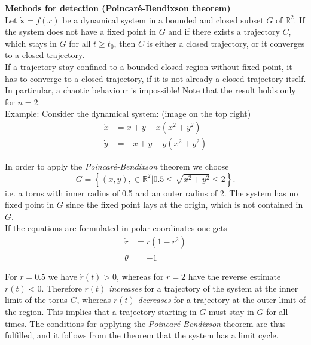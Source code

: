 \textbf{Methods for detection (Poincaré-Bendixson theorem)}\\
Let $\dot{\mathbf{x}} = f(x)$ be a dynamical system in a bounded and closed subset $G$ of $\mathbb{R}^2$. If the system does not have a fixed point in $G$ and if there exists a trajectory $C$, which stays in $G$ for all $t \geq t_0$, then $C$ is either a closed trajectory, or it converges to a closed trajectory.\\
If a trajectory stay confined to a bounded closed region without fixed point, it has to converge to a closed trajectory, if it is not already a closed trajectory itself. In particular, a chaotic behaviour is impossible! Note that the result holds only for $n = 2$.\\

Example: Consider the dynamical system: (image on the top right)
\begin{equation}
  \begin{split}
    \dot{x} &= x + y - x(x^2 + y^2)\\
    \dot{y} &= -x + y -y(x^2 + y^2)
  \end{split}
\end{equation}

In order to apply the \emph{Poincaré-Bendixson} theorem we choose
\begin{equation}
  G = \left \{(x, y), \in \mathbb{R}^2|0.5 \leq \sqrt{x^2 + y^2}\leq 2 \right \}.
\end{equation}
i.e. a torus with inner radius of 0.5 and an outer radius of 2. The system has no fixed point in $G$ since the fixed point lays at the origin, which is not contained in $G$.\\
If the equations are formulated in polar coordinates one gets
\begin{equation}
  \begin{split}
    \dot{r} &= r(1-r^2)\\
    \dot{\theta} &= -1
  \end{split}
\end{equation}

For $r = 0.5$ we have $\dot{r}(t) > 0$, whereas for $r = 2$ have the reverse estimate $\dot{r}(t) < 0$. Therefore $r(t)$ \emph{increases} for a trajectory of the system at the inner limit of the torus $G$, whereas $r(t)$ \emph{decreases} for a trajectory at the outer limit of the region. This implies that a trajectory starting in $G$ must stay in $G$ for all times. The conditions for applying the \emph{Poincaré-Bendixson} theorem are thus fulfilled, and it follows from the theorem that the system has a limit cycle.

